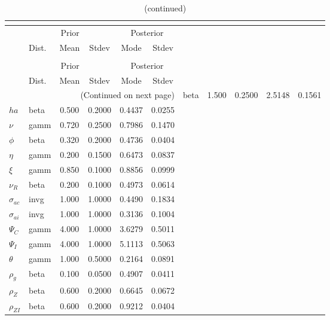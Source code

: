  
\begin{center}
\begin{longtable}{llcccc} 
\caption{Results from posterior maximization (parameters)}\\
 \label{Table:Posterior:1}\\
\toprule 
  & \multicolumn{3}{c}{Prior}  &  \multicolumn{2}{c}{Posterior} \\
  \cmidrule(r{.75em}){2-4} \cmidrule(r{.75em}){5-6}
  & Dist. & Mean  & Stdev & Mode & Stdev \\ 
\midrule \endfirsthead 
\caption{(continued)}\\
 \bottomrule 
  & \multicolumn{3}{c}{Prior}  &  \multicolumn{2}{c}{Posterior} \\
  \cmidrule(r{.75em}){2-4} \cmidrule(r{.75em}){5-6}
  & Dist. & Mean  & Stdev & Mode & Stdev \\ 
\midrule \endhead 
\bottomrule \multicolumn{6}{r}{(Continued on next page)}\endfoot 
\bottomrule\endlastfoot 
${\sigma}$ & beta &   1.500 & 0.2500 &   2.5148 &  0.1561 \\ 
${ha}$ & beta &   0.500 & 0.2000 &   0.4437 &  0.0255 \\ 
$\nu$ & gamm &   0.720 & 0.2500 &   0.7986 &  0.1470 \\ 
${\phi}$ & beta &   0.320 & 0.2000 &   0.4736 &  0.0404 \\ 
${\eta}$ & gamm &   0.200 & 0.1500 &   0.6473 &  0.0837 \\ 
$\xi$ & gamm &   0.850 & 0.1000 &   0.8856 &  0.0999 \\ 
${\nu_R}$ & beta &   0.200 & 0.1000 &   0.4973 &  0.0614 \\ 
${\sigma_{ac}}$ & invg &   1.000 & 1.0000 &   0.4490 &  0.1834 \\ 
${\sigma_{ai}}$ & invg &   1.000 & 1.0000 &   0.3136 &  0.1004 \\ 
${\Psi_{C}}$ & gamm &   4.000 & 1.0000 &   3.6279 &  0.5011 \\ 
${\Psi_I}$ & gamm &   4.000 & 1.0000 &   5.1113 &  0.5063 \\ 
${\theta}$ & gamm &   1.000 & 0.5000 &   0.2164 &  0.0891 \\ 
${\rho_g}$ & beta &   0.100 & 0.0500 &   0.4907 &  0.0411 \\ 
${\rho_Z}$ & beta &   0.600 & 0.2000 &   0.6645 &  0.0672 \\ 
${\rho_{ZI}}$ & beta &   0.600 & 0.2000 &   0.9212 &  0.0404 \\ 

\end{longtable}
\end{center}
